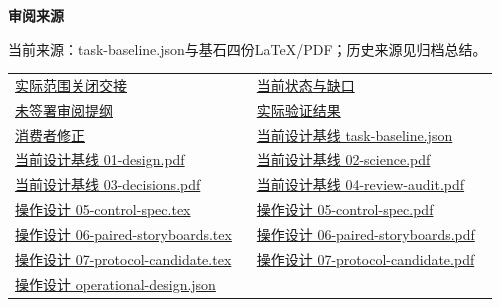 \documentclass[11pt,a4paper]{article}
\newcommand{\reviewsubsection}[1]{\par\Needspace{4\baselineskip}\vspace{4pt}\begin{center}{\titlelatin\titlecjk\bfseries\fontsize{12}{18}\selectfont #1}\end{center}}
\begin{document}
\begin{minipage}{\linewidth}
\reviewsubsection{3.4 审阅来源}
当前来源：task-\allowbreak{}baseline.json与基石四份LaTeX/\allowbreak{}PDF；历史来源见归档总结。


\begingroup\small\setlength{\tabcolsep}{4pt}\begin{tabular}{@{}p{0.48\linewidth}p{0.48\linewidth}@{}}
\href{file:///D:/Agent/srp/agent/tasks/A-06/outputs/current-scope.md}{实际范围关闭交接} & \href{file:///D:/Agent/srp/agent/tasks/A-06/outputs/current-scope.json}{当前状态与缺口}\\[4pt]
\href{file:///D:/Agent/srp/agent/tasks/A-06/outputs/scope-review-template.json}{未签署审阅提纲} & \href{file:///D:/Agent/srp/agent/tasks/A-06/evidence/verification.json}{实际验证结果}\\[4pt]
\href{file:///D:/Agent/srp/agent/tasks/A-06/evidence/consumer-impact.md}{消费者修正} & \href{file:///D:/Agent/srp/agent/design/design-foundation-20261008/task-baseline.json}{当前设计基线 task-\allowbreak{}baseline.json}\\[4pt]
\href{file:///D:/Agent/srp/agent/design/design-foundation-20261008/01-design.pdf}{当前设计基线 01-\allowbreak{}design.pdf} & \href{file:///D:/Agent/srp/agent/design/design-foundation-20261008/02-science.pdf}{当前设计基线 02-\allowbreak{}science.pdf}\\[4pt]
\href{file:///D:/Agent/srp/agent/design/design-foundation-20261008/03-decisions.pdf}{当前设计基线 03-\allowbreak{}decisions.pdf} & \href{file:///D:/Agent/srp/agent/design/design-foundation-20261008/04-review-audit.pdf}{当前设计基线 04-\allowbreak{}review-\allowbreak{}audit.pdf}\\[4pt]
\href{file:///D:/Agent/srp/agent/design/design-foundation-20261008/05-control-spec.tex}{操作设计 05-\allowbreak{}control-\allowbreak{}spec.tex} & \href{file:///D:/Agent/srp/agent/design/design-foundation-20261008/05-control-spec.pdf}{操作设计 05-\allowbreak{}control-\allowbreak{}spec.pdf}\\[4pt]
\href{file:///D:/Agent/srp/agent/design/design-foundation-20261008/06-paired-storyboards.tex}{操作设计 06-\allowbreak{}paired-\allowbreak{}storyboards.tex} & \href{file:///D:/Agent/srp/agent/design/design-foundation-20261008/06-paired-storyboards.pdf}{操作设计 06-\allowbreak{}paired-\allowbreak{}storyboards.pdf}\\[4pt]
\href{file:///D:/Agent/srp/agent/design/design-foundation-20261008/07-protocol-candidate.tex}{操作设计 07-\allowbreak{}protocol-\allowbreak{}candidate.tex} & \href{file:///D:/Agent/srp/agent/design/design-foundation-20261008/07-protocol-candidate.pdf}{操作设计 07-\allowbreak{}protocol-\allowbreak{}candidate.pdf}\\[4pt]
\href{file:///D:/Agent/srp/agent/design/design-foundation-20261008/operational-design.json}{操作设计 operational-\allowbreak{}design.json} & \\[4pt]
\end{tabular}\endgroup\end{minipage}\par
\end{document}

